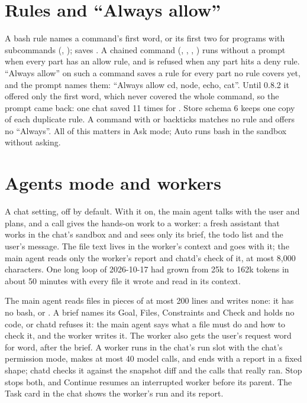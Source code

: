 \section{Rules and \enquote{Always allow}}

A bash rule names a command's first word, or its first two for programs with subcommands (, );  saves . A chained command (\code{&&}, \code{||}, \code{;}, \code{|}) runs without a prompt when every part has an allow rule, and is refused when any part hits a deny rule. \enquote{Always allow} on such a command saves a rule for every part no rule covers yet, and the prompt names them: \enquote{Always allow cd, node, echo, cat}. Until 0.8.2 it offered only the first word, which never covered the whole command, so the prompt came back: one chat saved  11 times for . Store schema 6 keeps one copy of each duplicate rule. A command with  or backticks matches no rule and offers no \enquote{Always}. All of this matters in Ask mode; Auto runs bash in the sandbox without asking.

\section{Agents mode and workers}\label{sec:chat-agents}

A chat setting, off by default. With it on, the main agent talks with the user and plans, and a  call gives the hands-on work to a worker: a fresh assistant that works in the chat's sandbox and  and sees only its brief, the todo list and the user's message. The file text lives in the worker's context and goes with it; the main agent reads only the worker's report and chatd's check of it, at most 8{,}000 characters. One long loop of 2026-10-17 had grown from 25k to 162k tokens in about 50 minutes with every file it wrote and read in its context.

The main agent reads files in pieces of at most 200 lines and writes none: it has no bash,  or . A brief names its Goal, Files, Constraints and Check and holds no code, or chatd refuses it: the main agent says what a file must do and how to check it, and the worker writes it. The worker also gets the user's request word for word, after the brief. A worker runs in the chat's run slot with the chat's permission mode, makes at most 40 model calls, and ends with a report in a fixed shape; chatd checks it against the snapshot diff and the calls that really ran. Stop stops both, and Continue resumes an interrupted worker before its parent. The Task card in the chat shows the worker's run and its report.

